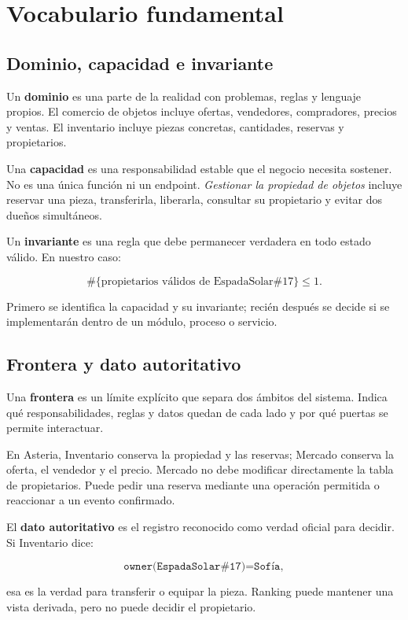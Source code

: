 \documentclass[variant=apuntes,cover=institutional,mode=screen]{ua-engineering-v6-article}
\begin{document}
\section{Vocabulario fundamental}

\subsection{Dominio, capacidad e invariante}

Un \textbf{dominio} es una parte de la realidad con problemas, reglas y lenguaje propios. El comercio de objetos incluye ofertas, vendedores, compradores, precios y ventas. El inventario incluye piezas concretas, cantidades, reservas y propietarios.

Una \textbf{capacidad} es una responsabilidad estable que el negocio necesita sostener. No es una única función ni un endpoint. \emph{Gestionar la propiedad de objetos} incluye reservar una pieza, transferirla, liberarla, consultar su propietario y evitar dos dueños simultáneos.

Un \textbf{invariante} es una regla que debe permanecer verdadera en todo estado válido. En nuestro caso:

\[
\#\{\text{propietarios válidos de EspadaSolar\#17}\}\leq 1.
\]

Primero se identifica la capacidad y su invariante; recién después se decide si se implementarán dentro de un módulo, proceso o servicio.

\subsection{Frontera y dato autoritativo}

Una \textbf{frontera} es un límite explícito que separa dos ámbitos del sistema. Indica qué responsabilidades, reglas y datos quedan de cada lado y por qué puertas se permite interactuar.

En Asteria, Inventario conserva la propiedad y las reservas; Mercado conserva la oferta, el vendedor y el precio. Mercado no debe modificar directamente la tabla de propietarios. Puede pedir una reserva mediante una operación permitida o reaccionar a un evento confirmado.

El \textbf{dato autoritativo} es el registro reconocido como verdad oficial para decidir. Si Inventario dice:

\[
\texttt{owner(EspadaSolar\#17)=Sofía},
\]

esa es la verdad para transferir o equipar la pieza. Ranking puede mantener una vista derivada, pero no puede decidir el propietario.
\end{document}
